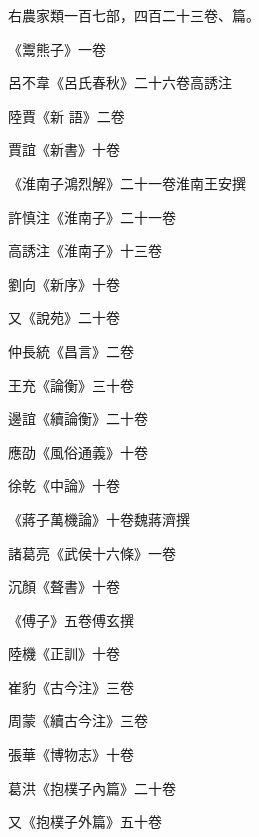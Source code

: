 \begin{pinyinscope}
 右農家類一百七部，四百二十三卷、篇。



 《鬻熊子》一卷



 呂不韋《呂氏春秋》二十六卷高誘注



 陸賈《新
 語》二卷



 賈誼《新書》十卷



 《淮南子鴻烈解》二十一卷淮南王安撰



 許慎注《淮南子》二十一卷



 高誘注《淮南子》十三卷



 劉向《新序》十卷



 又《說苑》二十卷



 仲長統《昌言》二卷



 王充《論衡》三十卷



 邊誼《續論衡》二十卷



 應劭《風俗通義》十卷



 徐乾《中論》十卷



 《蔣子萬機論》十卷魏蔣濟撰



 諸葛亮《武侯十六條》一卷



 沉顏《聱書》十卷



 《傅子》五卷傅玄撰



 陸機《正訓》十卷



 崔豹《古今注》三卷



 周蒙《續古今注》三卷



 張華《博物志》十卷



 葛洪《抱樸子內篇》二十卷



 又《抱樸子外篇》五十卷




\end{pinyinscope}

